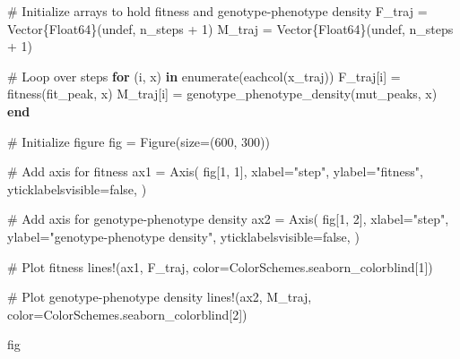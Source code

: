 \documentclass[
]{scrartcl}
\newenvironment{Shaded}{\begin{snugshade}}{\end{snugshade}}
\newcommand{\CommentTok}[1]{\textcolor[rgb]{0.37,0.37,0.37}{#1}}
\newcommand{\ConstantTok}[1]{\textcolor[rgb]{0.56,0.35,0.01}{#1}}
\newcommand{\ControlFlowTok}[1]{\textcolor[rgb]{0.00,0.23,0.31}{\textbf{#1}}}
\newcommand{\DataTypeTok}[1]{\textcolor[rgb]{0.68,0.00,0.00}{#1}}
\newcommand{\FloatTok}[1]{\textcolor[rgb]{0.68,0.00,0.00}{#1}}
\newcommand{\FunctionTok}[1]{\textcolor[rgb]{0.28,0.35,0.67}{#1}}
\newcommand{\KeywordTok}[1]{\textcolor[rgb]{0.00,0.23,0.31}{\textbf{#1}}}
\newcommand{\NormalTok}[1]{\textcolor[rgb]{0.00,0.23,0.31}{#1}}
\newcommand{\OperatorTok}[1]{\textcolor[rgb]{0.37,0.37,0.37}{#1}}
\newcommand{\StringTok}[1]{\textcolor[rgb]{0.13,0.47,0.30}{#1}}
\begin{document}
\begin{Shaded}
\begin{Highlighting}[]
\CommentTok{\# Initialize arrays to hold fitness and genotype{-}phenotype density}
\NormalTok{F\_traj }\OperatorTok{=} \FunctionTok{Vector}\DataTypeTok{\{Float64\}}\NormalTok{(}\ConstantTok{undef}\NormalTok{, n\_steps }\OperatorTok{+} \FloatTok{1}\NormalTok{)}
\NormalTok{M\_traj }\OperatorTok{=} \FunctionTok{Vector}\DataTypeTok{\{Float64\}}\NormalTok{(}\ConstantTok{undef}\NormalTok{, n\_steps }\OperatorTok{+} \FloatTok{1}\NormalTok{)}

\CommentTok{\# Loop over steps}
\ControlFlowTok{for}\NormalTok{ (i, x) }\KeywordTok{in} \FunctionTok{enumerate}\NormalTok{(}\FunctionTok{eachcol}\NormalTok{(x\_traj))}
\NormalTok{    F\_traj[i] }\OperatorTok{=} \FunctionTok{fitness}\NormalTok{(fit\_peak, x)}
\NormalTok{    M\_traj[i] }\OperatorTok{=} \FunctionTok{genotype\_phenotype\_density}\NormalTok{(mut\_peaks, x)}
\ControlFlowTok{end}

\CommentTok{\# Initialize figure}
\NormalTok{fig }\OperatorTok{=} \FunctionTok{Figure}\NormalTok{(size}\OperatorTok{=}\NormalTok{(}\FloatTok{600}\NormalTok{, }\FloatTok{300}\NormalTok{))}

\CommentTok{\# Add axis for fitness}
\NormalTok{ax1 }\OperatorTok{=} \FunctionTok{Axis}\NormalTok{(}
\NormalTok{    fig[}\FloatTok{1}\NormalTok{, }\FloatTok{1}\NormalTok{],}
\NormalTok{    xlabel}\OperatorTok{=}\StringTok{"step"}\NormalTok{,}
\NormalTok{    ylabel}\OperatorTok{=}\StringTok{"fitness"}\NormalTok{,}
\NormalTok{    yticklabelsvisible}\OperatorTok{=}\ConstantTok{false}\NormalTok{,}
\NormalTok{)}

\CommentTok{\# Add axis for genotype{-}phenotype density}
\NormalTok{ax2 }\OperatorTok{=} \FunctionTok{Axis}\NormalTok{(}
\NormalTok{    fig[}\FloatTok{1}\NormalTok{, }\FloatTok{2}\NormalTok{],}
\NormalTok{    xlabel}\OperatorTok{=}\StringTok{"step"}\NormalTok{,}
\NormalTok{    ylabel}\OperatorTok{=}\StringTok{"genotype{-}phenotype density"}\NormalTok{,}
\NormalTok{    yticklabelsvisible}\OperatorTok{=}\ConstantTok{false}\NormalTok{,}
\NormalTok{)}

\CommentTok{\# Plot fitness}
\FunctionTok{lines!}\NormalTok{(ax1, F\_traj, color}\OperatorTok{=}\NormalTok{ColorSchemes.seaborn\_colorblind[}\FloatTok{1}\NormalTok{])}

\CommentTok{\# Plot genotype{-}phenotype density}
\FunctionTok{lines!}\NormalTok{(ax2, M\_traj, color}\OperatorTok{=}\NormalTok{ColorSchemes.seaborn\_colorblind[}\FloatTok{2}\NormalTok{])}

\NormalTok{fig}
\end{Highlighting}
\end{Shaded}
\end{document}
